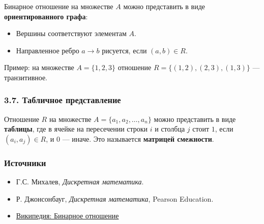 Бинарное отношение на множестве $A$ можно представить в виде \textbf{ориентированного графа}:

\begin{itemize}[leftmargin=*]
  \item Вершины соответствуют элементам $A$.
  \item Направленное ребро $a \to b$ рисуется, если $(a,b) \in R$.
\end{itemize}

Пример: на множестве $A = \{1, 2, 3\}$ отношение $R = \{(1,2), (2,3), (1,3)\}$ — транзитивное.

\subsubsection{3.7. Табличное представление}

Отношение $R$ на множестве $A = \{a_1, a_2, \dots, a_n\}$ можно представить в виде \textbf{таблицы}, где в ячейке на пересечении строки $i$ и столбца $j$ стоит $1$, если $(a_i, a_j) \in R$, и $0$ — иначе. Это называется \textbf{матрицей смежности}.

\subsubsection{Источники}

\begin{itemize}
  \item Г.С. Михалев, \textit{Дискретная математика}.
  \item Р. Джонсонбауг, \textit{Дискретная математика}, Pearson Education.
  \item \href{https://ru.wikipedia.org/wiki/Бинарное_отношение}{Википедия: Бинарное отношение}
\end{itemize}